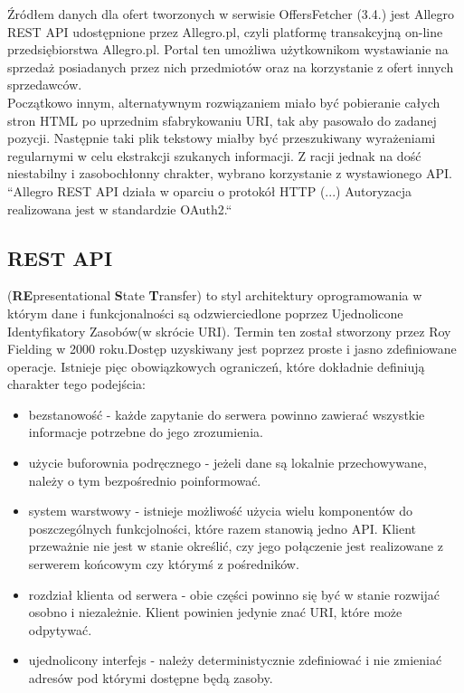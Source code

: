 Źródłem danych dla ofert tworzonych w serwisie OffersFetcher (3.4.)
jest Allegro REST API udostępnione przez Allegro.pl, czyli platformę transakcyjną on-line przedsiębiorstwa Allegro.pl. Portal ten umożliwa użytkownikom wystawianie na sprzedaż posiadanych przez nich przedmiotów oraz na korzystanie z ofert innych sprzedawców. \\ Początkowo innym, alternatywnym rozwiązaniem miało być pobieranie całych stron HTML po uprzednim sfabrykowaniu URI, tak aby pasowało do zadanej pozycji. Następnie taki plik tekstowy miałby być przeszukiwany wyrażeniami regularnymi w celu ekstrakcji szukanych informacji. Z racji jednak na dość niestabilny i zasobochłonny chrakter, wybrano korzystanie z wystawionego API.\\
``Allegro REST API działa w oparciu o protokół HTTP (...) Autoryzacja realizowana jest w standardzie OAuth2.``\cite{allegroApi}\linebreak

\subsection{REST API}
(\textbf{RE}presentational \textbf{S}tate \textbf{T}ransfer) to styl architektury oprogramowania w którym dane i funkcjonalności są odzwierciedlone poprzez Ujednolicone Identyfikatory Zasobów(w skrócie URI). Termin ten został stworzony przez Roy Fielding w 2000 roku\cite{fielding}.Dostęp uzyskiwany jest poprzez proste i jasno zdefiniowane operacje. \linebreak Istnieje pięc obowiązkowych ograniczeń, które dokładnie definiują charakter tego podejścia:
\begin{itemize}
	\item bezstanowość - każde zapytanie do serwera powinno zawierać wszystkie informacje potrzebne do jego zrozumienia.
	\item użycie buforownia podręcznego - jeżeli dane są lokalnie przechowywane, należy o tym bezpośrednio poinformować.
	\item system warstwowy - istnieje możliwość użycia wielu komponentów do poszczególnych funkcjolności, które razem stanowią jedno API. Klient przeważnie nie jest w stanie określić, czy jego połączenie jest realizowane z serwerem końcowym czy którymś z pośredników.
	\item rozdział klienta od serwera - obie części powinno się być w stanie rozwijać osobno i niezależnie. Klient powinien jedynie znać URI, które może odpytywać.
	\item ujednolicony interfejs - należy deterministycznie zdefiniować i nie zmieniać adresów pod którymi dostępne będą zasoby. 
\end{itemize}\cite{rest}

